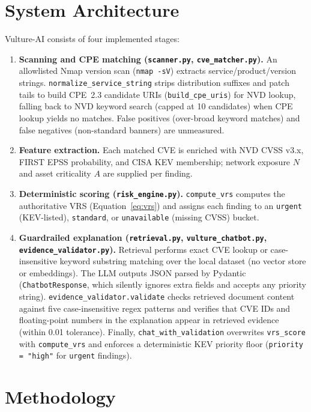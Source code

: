\documentclass[conference]{IEEEtran}
\begin{document}
\section{System Architecture}
\label{sec:arch}
Vulture-AI consists of four implemented stages:
\begin{enumerate}
    \item \textbf{Scanning and CPE matching (\texttt{scanner.py}, \texttt{cve\_matcher.py}).} An allowlisted Nmap version scan (\texttt{nmap -sV}) extracts service/product/version strings. \texttt{normalize\_service\_string} strips distribution suffixes and patch tails to build CPE~2.3 candidate URIs (\texttt{build\_cpe\_uris}) for NVD lookup, falling back to NVD keyword search (capped at 10 candidates) when CPE lookup yields no matches. False positives (over-broad keyword matches) and false negatives (non-standard banners) are unmeasured.
    \item \textbf{Feature extraction.} Each matched CVE is enriched with NVD CVSS v3.x, FIRST EPSS probability, and CISA KEV membership; network exposure $N$ and asset criticality $A$ are supplied per finding.
    \item \textbf{Deterministic scoring (\texttt{risk\_engine.py}).} \texttt{compute\_vrs} computes the authoritative VRS (Equation~\ref{eq:vrs}) and assigns each finding to an \texttt{urgent} (KEV-listed), \texttt{standard}, or \texttt{unavailable} (missing CVSS) bucket.
    \item \textbf{Guardrailed explanation (\texttt{retrieval.py}, \texttt{vulture\_chatbot.py}, \texttt{evidence\_validator.py}).} Retrieval performs exact CVE lookup or case-insensitive keyword substring matching over the local dataset (no vector store or embeddings). The LLM outputs JSON parsed by Pydantic (\texttt{ChatbotResponse}, which silently ignores extra fields and accepts any priority string). \texttt{evidence\_validator.validate} checks retrieved document content against five case-insensitive regex patterns and verifies that CVE IDs and floating-point numbers in the explanation appear in retrieved evidence (within 0.01 tolerance). Finally, \texttt{chat\_with\_validation} overwrites \texttt{vrs\_score} with \texttt{compute\_vrs} and enforces a deterministic KEV priority floor (\texttt{priority = "high"} for \texttt{urgent} findings).
\end{enumerate}

\section{Methodology}
\label{sec:method}
\end{document}
